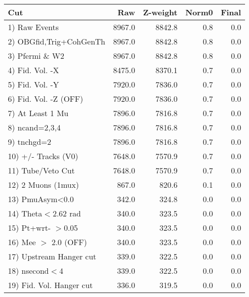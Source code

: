  \begin{table}[h!]\centering
 \begin{tabular}{||l||r|r|r|r||}
 \hline
 \hline
 Cut & Raw & Z-weight & Norm0 & Final \\
 \hline
  1) Raw Events           &      8967.0 &      8842.8 &         0.8 &         0.0 \\
  2) OBGfid,Trig+CohGenTh &      8967.0 &      8842.8 &         0.8 &         0.0 \\
  3) Pfermi \& W2         &      8967.0 &      8842.8 &         0.8 &         0.0 \\
  4) Fid. Vol. -X         &      8475.0 &      8370.1 &         0.7 &         0.0 \\
  5) Fid. Vol. -Y         &      7920.0 &      7836.0 &         0.7 &         0.0 \\
  6) Fid. Vol. -Z (OFF)   &      7920.0 &      7836.0 &         0.7 &         0.0 \\
  7) At Least 1 Mu        &      7896.0 &      7816.8 &         0.7 &         0.0 \\
  8) ncand=2,3,4          &      7896.0 &      7816.8 &         0.7 &         0.0 \\
  9) tnchgd=2             &      7896.0 &      7816.8 &         0.7 &         0.0 \\
 10) +/- Tracks (V0)      &      7648.0 &      7570.9 &         0.7 &         0.0 \\
 11) Tube/Veto Cut        &      7648.0 &      7570.9 &         0.7 &         0.0 \\
 12) 2 Muons (1mux)       &       867.0 &       820.6 &         0.1 &         0.0 \\
 13) PmuAsym<0.0          &       342.0 &       324.8 &         0.0 &         0.0 \\
 14) Theta$<$2.62 rad     &       340.0 &       323.5 &         0.0 &         0.0 \\
 15) Pt+wrt- $>$0.05      &       340.0 &       323.5 &         0.0 &         0.0 \\
 16) Mee $>$ 2.0  (OFF)   &       340.0 &       323.5 &         0.0 &         0.0 \\
 17) Upstream Hanger cut  &       339.0 &       322.5 &         0.0 &         0.0 \\
 18) nsecond$<$4          &       339.0 &       322.5 &         0.0 &         0.0 \\
 19) Fid. Vol. Hanger cut &       336.0 &       319.5 &         0.0 &         0.0 \\

\end{tabular}
\end{table}
